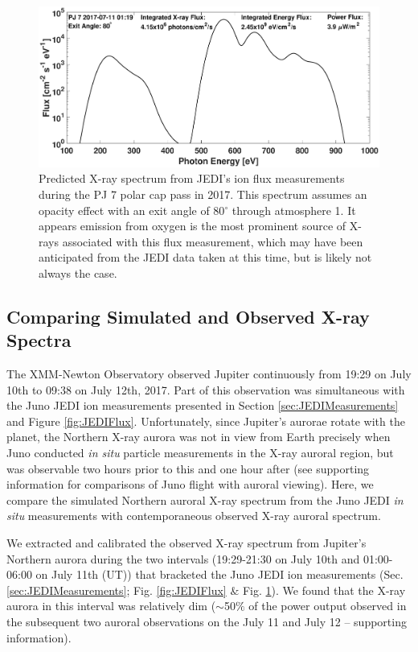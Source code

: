 \documentclass[draft]{agujournal2018}
\begin{document}
\begin{figure}
    \centering
    \includegraphics[width=\textwidth]{Figures/PJ7Spectrum.eps}
    \caption{Predicted X-ray spectrum from JEDI's ion flux measurements during the PJ 7 polar cap pass in 2017. This spectrum assumes an opacity effect with an exit angle of 80$^{\circ}$ through atmosphere 1. It appears emission from oxygen is the most prominent source of X-rays associated with this flux measurement, which may have been anticipated from the JEDI data taken at this time, but is likely  not always the case.}
    \label{fig:JEDISpec}
\end{figure}

\subsection{Comparing Simulated and Observed X-ray Spectra}

The XMM-Newton Observatory observed Jupiter continuously from 19:29 on July 10th to 09:38 on July 12th, 2017.
Part of this observation was simultaneous with the Juno JEDI ion measurements presented in Section \ref{sec:JEDIMeasurements} and Figure \ref{fig:JEDIFlux}.
Unfortunately, since Jupiter's aurorae rotate with the planet, the Northern X-ray aurora was not in view from Earth precisely when Juno conducted \textit{in situ} particle measurements in the X-ray auroral region, but was observable two hours prior to this and one hour after (see supporting information for comparisons of Juno flight with auroral viewing).
Here, we compare the simulated Northern auroral X-ray spectrum from the Juno JEDI \textit{in situ} measurements with contemporaneous observed X-ray auroral spectrum.

We extracted and calibrated the observed X-ray spectrum from Jupiter's Northern aurora during the two intervals (19:29-21:30 on July 10th and 01:00-06:00 on July 11th (UT)) that bracketed the Juno JEDI ion measurements (Sec. \ref{sec:JEDIMeasurements}; Fig. \ref{fig:JEDIFlux} $\&$ Fig. \ref{fig:JEDISpec}).
We found that the X-ray aurora in this interval was relatively dim ($\sim$50$\%$ of the power output observed in the subsequent two auroral observations on the July 11 and July 12 – supporting information).
\end{document}

